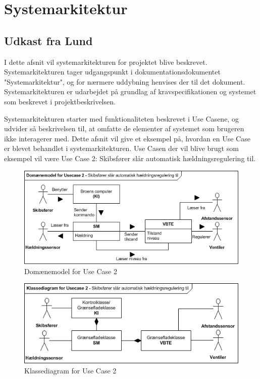 \section{Systemarkitektur}
\subsection{Udkast fra Lund}
I dette afsnit vil systemarkitekturen for projektet blive beskrevet. Systemarkitekturen tager udgangspunkt i dokumentationsdokumentet "Systemarkitektur", og for nærmere uddybning henvises der til det dokument. 
Systemarkitekturen er udarbejdet på grundlag af kravspecifikationen og systemet som beskrevet i projektbeskrivelsen.

Systemarkitekturen starter med funktionaliteten beskrevet i Use Casene, og udvider så beskrivelsen til, at omfatte de elementer af systemet som brugeren ikke interagerer med. Dette afsnit vil give et eksempel på, hvordan en Use Case er blevet behandlet i systemarkitekturen. Use Casen der vil blive brugt som eksempel vil være Use Case 2: Skibsfører slår automatisk hældningsregulering til.

\begin{figure}[H]
\centering
\includegraphics[scale=0.8]{billeder/Systemarkitektur/DM_UC2}
\caption{Domænemodel for Use Case 2}
\label{fig:dmuc2}
\end{figure}

\begin{figure}[H]
\centering
\includegraphics[scale=0.8]{billeder/Systemarkitektur/KD_UC2}
\caption{Klassediagram for Use Case 2}
\label{fig:kduc2}
\end{figure}

